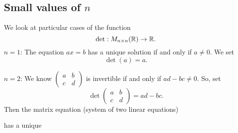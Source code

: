 \documentclass[10pt, a4paper]{article}
\begin{document}
\subsection{Small values of $n$}
We look at particular cases of the function
\[
\det : M_{n\times n}(\mathbb{R}) \rightarrow \mathbb{R}.
\]
$n = 1$:
The equation $ax = b$ has a unique solution if and only if $a \neq 0$.
We set
\[
\det(a) = a.
\]

$n = 2$:
We know $\begin{pmatrix}
    a & b \\ c & d
\end{pmatrix}$
is invertible if and only if $ad - bc \neq 0$.
So, set
\[
\det\begin{pmatrix}
    a & b \\ c & d
\end{pmatrix} = ad - bc.
\]
Then the matrix equation (system of two linear equations)

has a unique 
\end{document}
